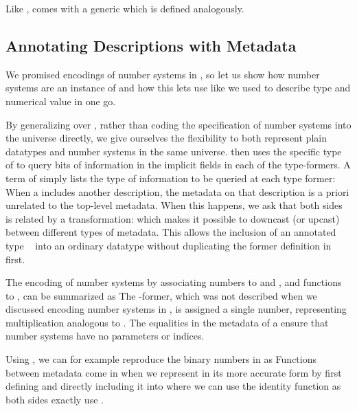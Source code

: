 Like ,  comes with a generic 
which is defined analogously.


\subsection{Annotating Descriptions with Metadata}
We promised encodings of number systems in , so let us show how number systems are an instance of  and how this lets use  like we used  to describe type and numerical value in one go.

By generalizing  over , rather than coding the specification of number systems into the universe directly, we give ourselves the flexibility to both represent plain datatypes and number systems in the same universe.  then uses the specific type of  to query bits of information in the implicit fields in each of the type-formers. A term of  simply lists the type of information to be queried at each type former: 
When a  includes another description, the metadata on that description is a priori unrelated to the top-level metadata. When this happens, we ask that both sides is related by a transformation:
which makes it possible to downcast (or upcast) between different types of metadata. This allows the inclusion of an annotated type \  into an ordinary datatype  without duplicating the former definition in  first.

The encoding of number systems by associating numbers to  and , and functions to , can be summarized as
The -former, which was not described when we discussed encoding number systems in , is assigned a single number, representing multiplication analogous to . The equalities in the metadata of a  ensure that number systems have no parameters or indices. 

Using , we can for example reproduce the binary numbers  in  as
Functions between metadata come in when we represent  in its more accurate form by first defining 
and directly including it into 
where we can use the identity function as both sides exactly use .

